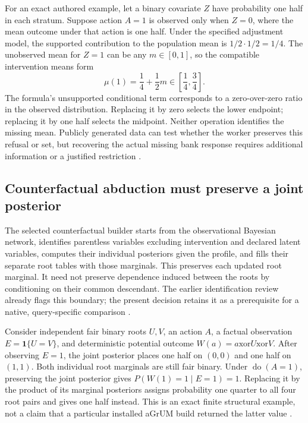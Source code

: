 For an exact authored example, let a binary covariate $Z$ have probability
one half in each stratum. Suppose action $A=1$ is observed only when $Z=0$,
where the mean outcome under that action is one half. Under the specified
adjustment model, the supported contribution to the population mean is
$1/2\cdot1/2=1/4$. The unobserved mean for $Z=1$ can be any $m\in[0,1]$,
so the compatible intervention means form
\[
 \mu(1)=\frac14+\frac12m\in\left[\frac14,\frac34\right].
\]
The formula's unsupported conditional term corresponds to a zero-over-zero
ratio in the observed distribution. Replacing it by zero selects the lower
endpoint; replacing it by one half selects the midpoint. Neither operation
identifies the missing mean. Publicly generated data can test whether the
worker preserves this refusal or set, but recovering the actual missing
bank response requires additional information or a justified restriction
\cite{exec24_agrum_choice}.

\subsection{Counterfactual abduction must preserve a joint posterior}
The selected counterfactual builder starts from the observational Bayesian
network, identifies parentless variables excluding intervention and declared
latent variables, computes their individual posteriors given the profile,
and fills their separate root tables with those marginals. This preserves
each updated root marginal. It need not preserve dependence induced between
the roots by conditioning on their common descendant. The earlier
identification review already flags this boundary; the present decision
retains it as a prerequisite for a native, query-specific comparison
\cite{exec19_cxx_identification_source,exec24_agrum_source}.

Consider independent fair binary roots $U,V$, an action $A$, a factual
observation $E=\mathbf1\{U=V\}$, and deterministic potential outcome
$W(a)=a\mathbin{\mathrm{xor}}U\mathbin{\mathrm{xor}}V$.
After observing $E=1$, the joint posterior places one half on $(0,0)$ and
one half on $(1,1)$. Both individual root marginals are still fair binary.
Under $\operatorname{do}(A=1)$, preserving the joint posterior gives
$P(W(1)=1\mid E=1)=1$. Replacing it by the product of its marginal
posteriors assigns probability one quarter to all four root pairs and gives
one half instead. This is an exact finite structural example, not a claim
that a particular installed aGrUM build returned the latter value
\cite{exec24_agrum_choice}.


